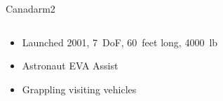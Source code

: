 \documentclass[10pt]{beamer}
\begin{document}
\begin{frame}[fragile]{Canadarm2}
  \begin{columns}[T]
    \begin{column}{.4\textwidth}
      \begin{itemize}
        \setlength\itemsep{1em}
        \item <1->Launched 2001, 7~DoF, 60~feet long, 4000~lb
        \item <2->Astronaut EVA Assist
        \item <3->Grappling visiting vehicles
      \end{itemize}
    \end{column}
    \begin{column}{.6\textwidth}
\end{column}
\end{columns}
\end{frame}
\end{document}

